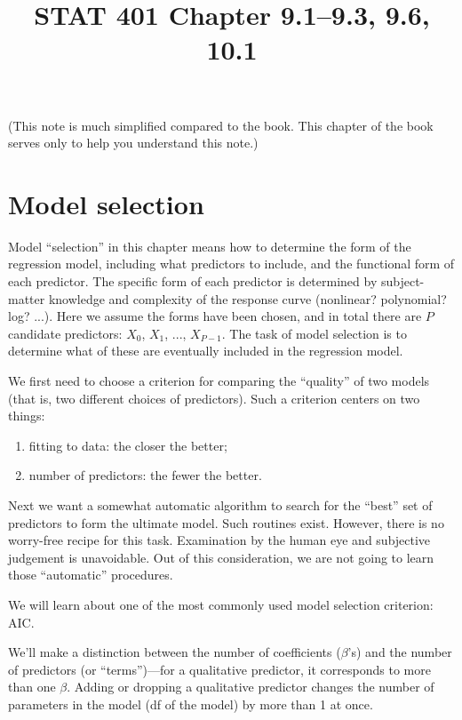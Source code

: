 \documentclass[12pt]{article}
\begin{document}
\title{STAT 401 Chapter 9.1--9.3, 9.6, 10.1}
\maketitle

(This note is much simplified compared to the book.
This chapter of the book serves only to help you understand this note.)


\section{Model selection}

Model ``selection'' in this chapter means how to determine
the form of the regression model, including
what predictors to include, and the functional form of each predictor.
The specific form of each predictor is determined by subject-matter
knowledge and complexity of the response curve
(nonlinear? polynomial? log? ...).
Here we assume the forms have been chosen, and in total there are
$P$ candidate predictors: $X_0$, $X_1$, ..., $X_{P-1}$.
The task of model selection is to determine what of these are eventually
included in the regression model.

We first need to choose a criterion for comparing the ``quality'' of two
models (that is, two different choices of predictors).
Such a criterion centers on two things:
\begin{enumerate}
\item fitting to data: the closer the better;
\item number of predictors: the fewer the better.
\end{enumerate}

Next we want a somewhat automatic algorithm to search for the
``best'' set of predictors to form the ultimate model.
Such routines exist.
However,
there is no worry-free recipe for this task.
Examination by the human eye and subjective judgement is unavoidable.
Out of this consideration,
we are not going to learn those ``automatic'' procedures.

We will learn about one of the most commonly used model selection
criterion: AIC.

We'll make a distinction between the number of coefficients ($\beta$'s)
and the number of predictors (or ``terms'')---for a qualitative
predictor, it corresponds to more than one $\beta$.
Adding or dropping a qualitative predictor changes the number of
parameters in the model (df of the model) by more than 1 at once.
\end{document}
